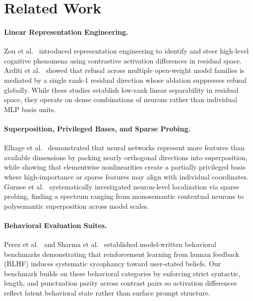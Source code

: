 \documentclass[11pt, a4paper]{article}
\begin{document}
\section{Related Work}

\paragraph{Linear Representation Engineering.} Zou et al.\ \cite{zou2023repe} introduced representation engineering to identify and steer high-level cognitive phenomena using contrastive activation differences in residual space. Arditi et al.\ \cite{arditi2024refusal} showed that refusal across multiple open-weight model families is mediated by a single rank-1 residual direction whose ablation suppresses refusal globally. While these studies establish low-rank linear separability in residual space, they operate on dense combinations of neurons rather than individual MLP basis units.

\paragraph{Superposition, Privileged Bases, and Sparse Probing.} Elhage et al.\ \cite{elhage2022superposition} demonstrated that neural networks represent more features than available dimensions by packing nearly orthogonal directions into superposition, while showing that elementwise nonlinearities create a partially privileged basis where high-importance or sparse features may align with individual coordinates. Gurnee et al.\ \cite{gurnee2023haystack} systematically investigated neuron-level localization via sparse probing, finding a spectrum ranging from monosemantic contextual neurons to polysemantic superposition across model scales.

\paragraph{Behavioral Evaluation Suites.} Perez et al.\ \cite{perez2023discovering} and Sharma et al.\ \cite{sharma2024sycophancy} established model-written behavioral benchmarks demonstrating that reinforcement learning from human feedback (RLHF) induces systematic sycophancy toward user-stated beliefs. Our benchmark builds on these behavioral categories by enforcing strict syntactic, length, and punctuation parity across contrast pairs so activation differences reflect latent behavioral state rather than surface prompt structure.
\end{document}
